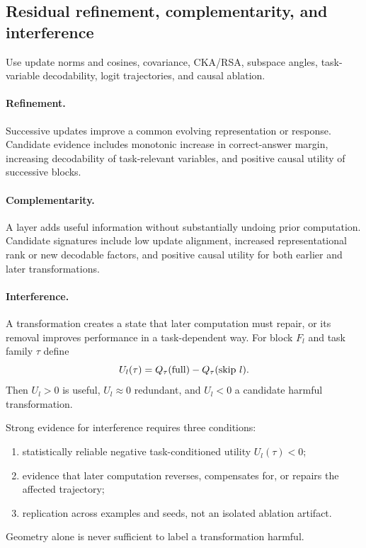 \documentclass[10pt]{article}
\begin{document}
\subsection{Residual refinement, complementarity, and interference}
Use update norms and cosines, covariance, CKA/RSA, subspace angles, task-variable decodability, logit trajectories, and causal ablation.

\paragraph{Refinement.} Successive updates improve a common evolving representation or response. Candidate evidence includes monotonic increase in correct-answer margin, increasing decodability of task-relevant variables, and positive causal utility of successive blocks.

\paragraph{Complementarity.} A layer adds useful information without substantially undoing prior computation. Candidate signatures include low update alignment, increased representational rank or new decodable factors, and positive causal utility for both earlier and later transformations.

\paragraph{Interference.} A transformation creates a state that later computation must repair, or its removal improves performance in a task-dependent way. For block $F_l$ and task family $\tau$ define
\[
U_l(\tau)=Q_\tau({\rm full})-Q_\tau({\rm skip}\ l).
\]
Then $U_l>0$ is useful, $U_l\approx0$ redundant, and $U_l<0$ a candidate harmful transformation.

Strong evidence for interference requires three conditions:
\begin{enumerate}[leftmargin=*]
\item statistically reliable negative task-conditioned utility $U_l(\tau)<0$;
\item evidence that later computation reverses, compensates for, or repairs the affected trajectory;
\item replication across examples and seeds, not an isolated ablation artifact.
\end{enumerate}
Geometry alone is never sufficient to label a transformation harmful.
\end{document}

